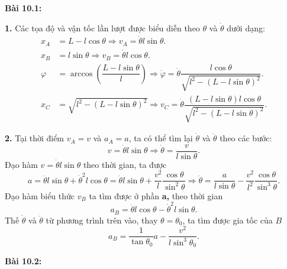 \textbf{Bài 10.1:} 

\textbf{1.} Các tọa độ và vận tốc lần lượt được biểu diễn theo $\theta$ và $\dot{\theta}$ dưới dạng:
\begin{align*}
    x_A &= L - l \cos \theta \Rightarrow v_A= \dot{\theta} l \sin \theta. \\
    x_B &= l \sin \theta \Rightarrow v_B = \dot{\theta} l \cos \theta. \\
    \varphi &= \arccos \left( \dfrac{L - l \sin \theta}{l} \right) \Rightarrow \dot{\varphi} = \dot{\theta} \dfrac{l \cos \theta}{\sqrt{l^2 - \left( L - l \sin \theta \right)^2}}. \\
    x_C &= \sqrt{l^2 - \left( L - l \sin \theta \right)^2} \Rightarrow v_C = \dot{\theta} \dfrac{(L-l \sin \theta) l \cos \theta}{\sqrt{l^2 - \left( L - l \sin \theta \right)^2}}.
\end{align*}

\textbf{2.} Tại thời điểm \(v_A=v\) và \(a_A=a\), ta có thể tìm lại \(\dot{\theta}\) và \(\ddot{\theta}\) theo các bước:
\begin{equation} \label{eq1_rectangle_collision}
    v=\dot{\theta} l \sin \theta \Rightarrow \dot{\theta}= \dfrac{v}{l \sin \theta}.
\end{equation}
Đạo hàm $v=\dot{\theta} l \sin \theta$ theo thời gian, ta được
\begin{equation} \label{eq2_rectangle_collision}
    a = \ddot{\theta} l \sin \theta + \dot{\theta}^2 l \cos \theta = \ddot{\theta} l \sin \theta + \dfrac{v^2}{l} \dfrac{\cos \theta}{\sin^2 \theta} \Rightarrow \ddot{\theta}= \dfrac{a}{l \sin \theta} - \dfrac{v^2}{l^2} \dfrac{\cos \theta}{\sin^3 \theta}.
\end{equation}
Đạo hàm biểu thức $v_B$ ta tìm được ở phần \textbf{a,} theo thời gian
\begin{equation} \label{eq3_rectangle_collision}
    a_B = \ddot{\theta} l \cos \theta - \dot{\theta}^2 l \sin \theta.
\end{equation}
Thế $\dot{\theta}$ và $\ddot{\theta}$ từ phương trình trên vào, thay $\theta=\theta_0$, ta tìm được gia tốc của $B$
\begin{equation} \label{eq4_rectangle_collision}
    a_B = \dfrac{1}{\tan \theta_0} a - \dfrac{v^2}{l \sin^3 \theta_0}.
\end{equation}


\textbf{Bài 10.2:}


\begin{refsection}
\nocite{tuan2019kinematic,craig2011introduction}
\printbibliography
\end{refsection}